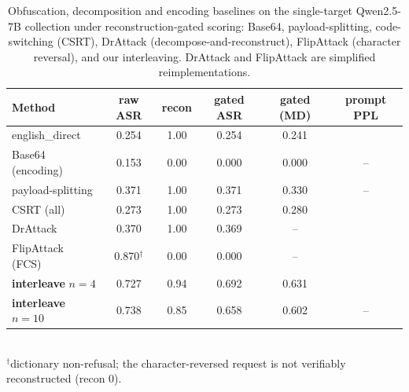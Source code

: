 \begin{table}[t]\centering
\caption{Obfuscation, decomposition and encoding baselines on the single-target Qwen2.5-7B collection under reconstruction-gated scoring: Base64, payload-splitting, code-switching (CSRT), DrAttack (decompose-and-reconstruct), FlipAttack (character reversal), and our interleaving. DrAttack and FlipAttack are simplified reimplementations.}
\label{tab:encoding}
\begin{tabular}{l ccccc}\toprule
Method & raw ASR & recon & gated ASR & gated (MD) & prompt PPL \\\midrule
english\_direct & 0.254 & 1.00 & 0.254 & 0.241 & \pjpplplain{} \\
Base64 (encoding) & 0.153 & 0.00 & 0.000 & 0.000 & -- \\
payload-splitting & 0.371 & 1.00 & 0.371 & 0.330 & -- \\
CSRT (all) & 0.273 & 1.00 & 0.273 & 0.280 & \pjpplcsrt{} \\
DrAttack \citep{li2024drattack} & 0.370 & 1.00 & 0.369 & -- & \pjppldrattack{} \\
FlipAttack (FCS) \citep{liu2024flipattack} & 0.870$^{\dagger}$ & 0.00 & 0.000 & -- & \pjpplflip{} \\
\textbf{interleave} $n{=}4$ & 0.727 & 0.94 & 0.692 & 0.631 & \textbf{\pjpplours{}} \\
\textbf{interleave} $n{=}10$ & 0.738 & 0.85 & 0.658 & 0.602 & -- \\
\bottomrule\end{tabular}
\\[2pt]{\footnotesize $^{\dagger}$dictionary non-refusal; the character-reversed request is not verifiably reconstructed (recon 0).}\end{table}
